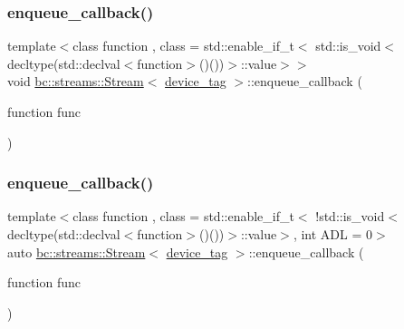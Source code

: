 \subsubsection{\texorpdfstring{enqueue\+\_\+callback()}{enqueue\_callback()}\hspace{0.1cm}{\footnotesize\ttfamily [1/2]}}
{\footnotesize\ttfamily template$<$class function , class  = std\+::enable\+\_\+if\+\_\+t$<$				std\+::is\+\_\+void$<$						decltype(std\+::declval$<$function$>$()())$>$\+::value$>$$>$ \\
void \hyperlink{classbc_1_1streams_1_1Stream}{bc\+::streams\+::\+Stream}$<$ \hyperlink{structbc_1_1device__tag}{device\+\_\+tag} $>$\+::enqueue\+\_\+callback (\begin{DoxyParamCaption}\item[{function}]{func }\end{DoxyParamCaption})\hspace{0.3cm}{\ttfamily [inline]}}

\mbox{\label{classbc_1_1streams_1_1Stream_3_01device__tag_01_4_a094bcf56ef60a630cef64dbadb7e9040}} 
\subsubsection{\texorpdfstring{enqueue\+\_\+callback()}{enqueue\_callback()}\hspace{0.1cm}{\footnotesize\ttfamily [2/2]}}
{\footnotesize\ttfamily template$<$class function , class  = std\+::enable\+\_\+if\+\_\+t$<$				!std\+::is\+\_\+void$<$						decltype(std\+::declval$<$function$>$()())$>$\+::value$>$, int A\+DL = 0$>$ \\
auto \hyperlink{classbc_1_1streams_1_1Stream}{bc\+::streams\+::\+Stream}$<$ \hyperlink{structbc_1_1device__tag}{device\+\_\+tag} $>$\+::enqueue\+\_\+callback (\begin{DoxyParamCaption}\item[{function}]{func }\end{DoxyParamCaption})\hspace{0.3cm}{\ttfamily [inline]}}

\mbox{\label{classbc_1_1streams_1_1Stream_3_01device__tag_01_4_adbe0962ec7ea1cf8b5fb335dc2a76480}} 
